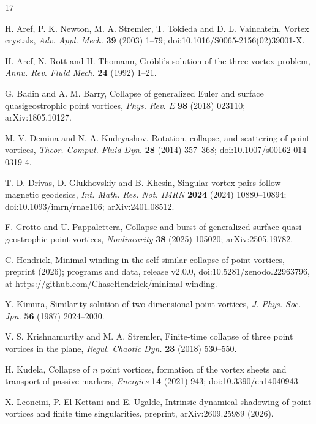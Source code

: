 \documentclass[11pt]{article}
\theoremstyle{definition}
\begin{document}
\begin{thebibliography}{17}
\small

 H. Aref, P. K. Newton, M. A. Stremler, T. Tokieda and D. L. Vainchtein, Vortex crystals, \emph{Adv. Appl. Mech.} \textbf{39} (2003) 1--79; doi:10.1016/S0065-2156(02)39001-X.

 H. Aref, N. Rott and H. Thomann, Gr\"obli's solution of the three-vortex problem, \emph{Annu. Rev. Fluid Mech.} \textbf{24} (1992) 1--21.

 G. Badin and A. M. Barry, Collapse of generalized Euler and surface quasigeostrophic point vortices, \emph{Phys. Rev. E} \textbf{98} (2018) 023110; arXiv:1805.10127.

 M. V. Demina and N. A. Kudryashov, Rotation, collapse, and scattering of point vortices, \emph{Theor. Comput. Fluid Dyn.} \textbf{28} (2014) 357--368; doi:10.1007/s00162-014-0319-4.

 T. D. Drivas, D. Glukhovskiy and B. Khesin, Singular vortex pairs follow magnetic geodesics, \emph{Int. Math. Res. Not. IMRN} \textbf{2024} (2024) 10880--10894; doi:10.1093/imrn/rnae106; arXiv:2401.08512.

 F. Grotto and U. Pappalettera, Collapse and burst of generalized surface quasi-geostrophic point vortices, \emph{Nonlinearity} \textbf{38} (2025) 105020; arXiv:2505.19782.

 C. Hendrick, Minimal winding in the self-similar collapse of point vortices, preprint (2026); programs and data, release v2.0.0, doi:10.5281/zenodo.22963796, at \url{https://github.com/ChaseHendrick/minimal-winding}.

 Y. Kimura, Similarity solution of two-dimensional point vortices, \emph{J. Phys. Soc. Jpn.} \textbf{56} (1987) 2024--2030.

 V. S. Krishnamurthy and M. A. Stremler, Finite-time collapse of three point vortices in the plane, \emph{Regul. Chaotic Dyn.} \textbf{23} (2018) 530--550.

 H. Kudela, Collapse of $n$ point vortices, formation of the vortex sheets and transport of passive markers, \emph{Energies} \textbf{14} (2021) 943; doi:10.3390/en14040943.

 X. Leoncini, P. El Kettani and E. Ugalde, Intrinsic dynamical shadowing of point vortices and finite time singularities, preprint, arXiv:2609.25989 (2026).


\end{thebibliography}
\end{document}
